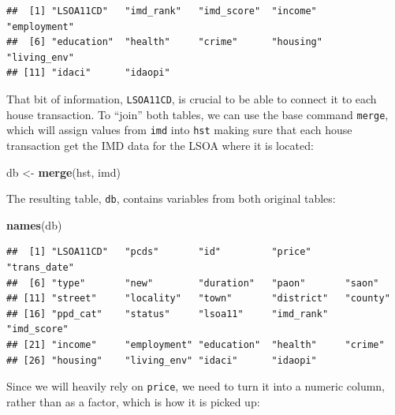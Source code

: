 \documentclass[]{book}
\newenvironment{Shaded}{\begin{snugshade}}{\end{snugshade}}
\newcommand{\KeywordTok}[1]{\textcolor[rgb]{0.13,0.29,0.53}{\textbf{#1}}}
\newcommand{\StringTok}[1]{\textcolor[rgb]{0.31,0.60,0.02}{#1}}
\newcommand{\OperatorTok}[1]{\textcolor[rgb]{0.81,0.36,0.00}{\textbf{#1}}}
\newcommand{\NormalTok}[1]{#1}
\begin{document}
\begin{verbatim}
##  [1] "LSOA11CD"   "imd_rank"   "imd_score"  "income"     "employment"
##  [6] "education"  "health"     "crime"      "housing"    "living_env"
## [11] "idaci"      "idaopi"
\end{verbatim}

That bit of information, \texttt{LSOA11CD}, is crucial to be able to
connect it to each house transaction. To ``join'' both tables, we can
use the base command \texttt{merge}, which will assign values from
\texttt{imd} into \texttt{hst} making sure that each house transaction
get the IMD data for the LSOA where it is located:

\begin{Shaded}
\begin{Highlighting}[]
\NormalTok{db <-}\StringTok{ }\KeywordTok{merge}\NormalTok{(hst, imd)}
\end{Highlighting}
\end{Shaded}

The resulting table, \texttt{db}, contains variables from both original
tables:

\begin{Shaded}
\begin{Highlighting}[]
\KeywordTok{names}\NormalTok{(db)}
\end{Highlighting}
\end{Shaded}

\begin{verbatim}
##  [1] "LSOA11CD"   "pcds"       "id"         "price"      "trans_date"
##  [6] "type"       "new"        "duration"   "paon"       "saon"      
## [11] "street"     "locality"   "town"       "district"   "county"    
## [16] "ppd_cat"    "status"     "lsoa11"     "imd_rank"   "imd_score" 
## [21] "income"     "employment" "education"  "health"     "crime"     
## [26] "housing"    "living_env" "idaci"      "idaopi"
\end{verbatim}

Since we will heavily rely on \texttt{price}, we need to turn it into a
numeric column, rather than as a factor, which is how it is picked up:

\begin{Shaded}
\end{Shaded}
\end{document}
